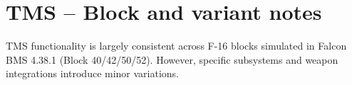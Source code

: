 \documentclass[11pt, a4paper, twoside]{report}
\newenvironment{hotastable}[1]{%
	\footnotesize
	\setlength{\tabcolsep}{3pt}
	\renewcommand{\arraystretch}{1.35}
	\begin{longtable}{L{1.00cm} L{0.90cm} L{0.90cm} L{3.30cm} L{6.40cm} L{1.40cm} L{1.60cm}}
		\caption{#1}\label{table.\thetable}\\
		\noalign{\addtocontents{hotas}{\protect\contentsline{table}{\protect\numberline{\thetable}#1}{\thepage}{table.\thetable}}}%
		\rowcolor{headerblue}
		\multicolumn{1}{>{\centering\arraybackslash}p{1.00cm}}{\textbf{\color{white}Mode}} &
		\multicolumn{1}{>{\centering\arraybackslash}p{0.90cm}}{\textbf{\color{white}Dir.}} &
		\multicolumn{1}{>{\centering\arraybackslash}p{0.90cm}}{\textbf{\color{white}Act.}} &
		\multicolumn{1}{>{\centering\arraybackslash}p{3.30cm}}{\textbf{\color{white}Function}} &
		\multicolumn{1}{>{\centering\arraybackslash}p{6.40cm}}{\textbf{\color{white}Effect / Nuance}} &
		\multicolumn{1}{>{\centering\arraybackslash}p{1.40cm}}{\textbf{\color{white}Dash34}} &
		\multicolumn{1}{>{\centering\arraybackslash}p{1.60cm}}{\textbf{\color{white}Train.}} \\
		\endfirsthead
		\rowcolor{headerblue}
		\multicolumn{1}{>{\centering\arraybackslash}p{1.00cm}}{\textbf{\color{white}Mode}} &
		\multicolumn{1}{>{\centering\arraybackslash}p{0.90cm}}{\textbf{\color{white}Dir.}} &
		\multicolumn{1}{>{\centering\arraybackslash}p{0.90cm}}{\textbf{\color{white}Act.}} &
		\multicolumn{1}{>{\centering\arraybackslash}p{3.30cm}}{\textbf{\color{white}Function}} &
		\multicolumn{1}{>{\centering\arraybackslash}p{6.40cm}}{\textbf{\color{white}Effect / Nuance}} &
		\multicolumn{1}{>{\centering\arraybackslash}p{1.40cm}}{\textbf{\color{white}Dash34}} &
		\multicolumn{1}{>{\centering\arraybackslash}p{1.60cm}}{\textbf{\color{white}Train.}} \\
		\endhead
		\multicolumn{7}{r}{\small\emph{Continued on next page}}\\
		\endfoot
		\endlastfoot
	}{%
	\end{longtable}
}
\begin{document}



\newpage
\section{TMS -- Block and variant notes}
\label{sec:C4-S6}

TMS functionality is largely consistent across F-16 blocks simulated in Falcon BMS 4.38.1 (Block 40/42/50/52). However, specific subsystems and weapon integrations introduce minor variations.
\end{document}
